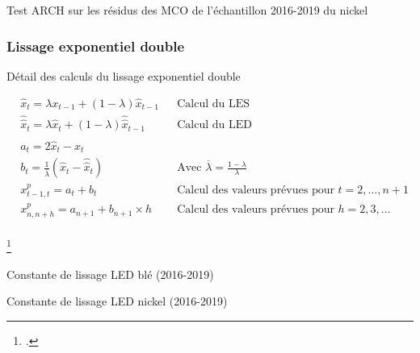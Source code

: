 \documentclass[12pt,a4paper]{article}
\begin{document}
\begin{table}[H]
    \centering
    \caption{Test ARCH sur les résidus des MCO de l'échantillon 2016-2019 du nickel}
    \sffamily
    \resizebox{0.6\textwidth}{!}{}
\end{table}
\clearpage
\subsubsection{Lissage exponentiel double}\label{appendix:led_19}
\begin{table}[H]
    \caption[led]{Détail des calculs du lissage exponentiel double\footnotemark }
    \label{tab:led}
    \begin{align*}
        &\hat{x}_{t} = \lambda x_{t-1} + (1 - \lambda)\hat{x}_{t-1} & &\text{Calcul du LES}\\
        &\hat{\hat{x}}_{t} = \lambda \hat{x}_{t} + (1 - \lambda)\hat{\hat{x}}_{t-1} & &\text{Calcul du LED}\\
        &a_{t} = 2\hat{x}_t - \hat{\hat{x}}_{t} & & \\
        &b_{t} = \frac{1}{\overline{\lambda}} (\hat{x}_{t} - \hat{\hat{x}}_{t}) & &\text{Avec  } \overline{\lambda}= \frac{1-\lambda}{\lambda}\\
        &x_{t-1, t}^{p} = a_{t} + b_{t} & & \text{Calcul des valeurs prévues pour $t=2,\dots,n+1$}\\
        &x_{n, n+h}^{p} = a_{n+1} + b_{n+1} \times h & & \text{Calcul des valeurs prévues pour $h=2,3,\dots$}\\
    \end{align*}
\end{table}
\footcitetext{terraza}
\begin{table}[H]
    \centering
    \caption{Constante de lissage LED blé (2016-2019)}
    \label{tab:led_ble19}
    \sffamily
    
\end{table}

\begin{table}[H]
    \centering
    \caption{Constante de lissage LED nickel (2016-2019)}
    \label{tab:led_nickel19}
    \sffamily
    
\end{table}
\end{document}
